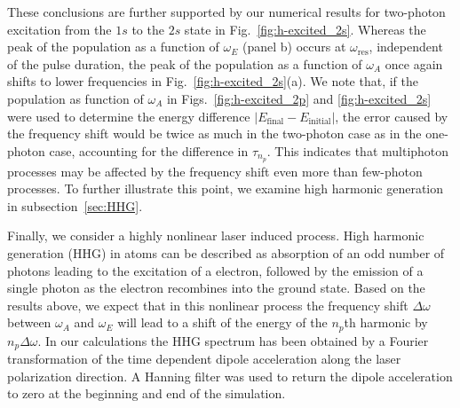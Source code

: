 These conclusions are further supported by our numerical results for two-photon excitation from the $1s$ to the $2s$ state in Fig.~\ref{fig:h-excited_2s}. Whereas the peak of the population as a function of $\omega_E$ (panel b) occurs at $\omega_\text{res}$, independent of the pulse duration, the peak of the population as a function of  $\omega_A$ once again shifts to lower frequencies in Fig.~\ref{fig:h-excited_2s}(a). We note that, if the population as function of $\omega_A$ in Figs.~\ref{fig:h-excited_2p} and \ref{fig:h-excited_2s} were used to determine the energy difference $|E_\text{final} - E_\text{initial}|$, the error caused by the frequency shift would be twice as much in the two-photon case as in the one-photon case, accounting for the difference in $\tau_{n_p}$. This indicates that multiphoton processes may be affected by the frequency shift even more than few-photon processes. To further illustrate this point, we examine high harmonic generation in subsection~\ref{sec:HHG}.


Finally, we consider a highly nonlinear laser induced process. High harmonic generation (HHG) in atoms can be described as absorption of an odd number of photons leading to the excitation of a electron, followed by the emission of a single photon as the electron recombines into the ground state. Based on the results above, we expect that in this nonlinear process the frequency shift $\Delta\omega$ between $\omega_A$ and $\omega_E$ will lead to a shift of the energy of the $n_p$th harmonic by $n_p\Delta\omega$. In our calculations the HHG spectrum has been obtained by a Fourier transformation of the time dependent dipole acceleration along the laser polarization direction. A Hanning filter was used to return the dipole acceleration to zero at the beginning and end of the simulation. 

